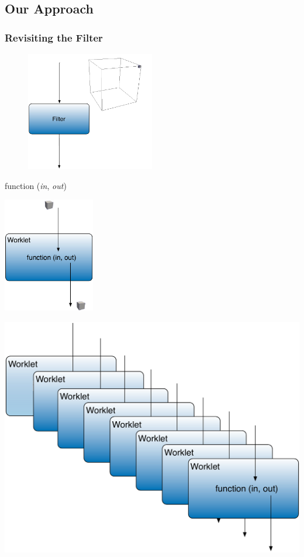 \documentclass[brown]{beamer}
\begin{document}
\subsection{Our Approach}
\frame
{
  \frametitle{Revisiting the Filter}
  \begin{figure}
  \centering
  \includegraphics[width=0.5\textwidth]{images/SingleElementFilter.pdf}
  \end{figure}
}

\frame
{
  \begin{center}
  {\ttfamily
  function (\emph{in}, \emph{out})}
  \end{center}
}

\frame
{
  \begin{center}
  \includegraphics[width=0.3\textwidth]{images/worklet.pdf}
  \end{center}
}

\frame
{
  \begin{center}
  \includegraphics[width=\textwidth]{images/many_worklets.pdf}
  \end{center}
}
\end{document}
